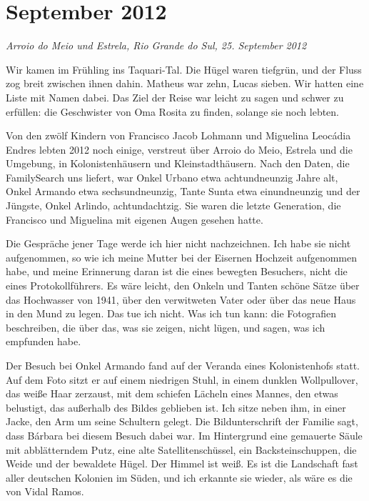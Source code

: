\documentclass[
  ngerman,
  11pt,
  openany]{book}
\begin{document}
\section{September 2012}\label{september-2012}

\emph{Arroio do Meio und Estrela, Rio Grande do Sul, 25. September 2012}

Wir kamen im Frühling ins Taquari-Tal. Die Hügel waren tiefgrün, und der
Fluss zog breit zwischen ihnen dahin. Matheus war zehn, Lucas sieben.
Wir hatten eine Liste mit Namen dabei. Das Ziel der Reise war leicht zu
sagen und schwer zu erfüllen: die Geschwister von Oma Rosita zu finden,
solange sie noch lebten.

Von den zwölf Kindern von Francisco Jacob Lohmann und Miguelina Leocádia
Endres lebten 2012 noch einige, verstreut über Arroio do Meio, Estrela
und die Umgebung, in Kolonistenhäusern und Kleinstadthäusern. Nach den
Daten, die FamilySearch uns liefert, war Onkel Urbano etwa
achtundneunzig Jahre alt, Onkel Armando etwa sechsundneunzig, Tante
Sunta etwa einundneunzig und der Jüngste, Onkel Arlindo, achtundachtzig.
Sie waren die letzte Generation, die Francisco und Miguelina mit eigenen
Augen gesehen hatte.

Die Gespräche jener Tage werde ich hier nicht nachzeichnen. Ich habe sie
nicht aufgenommen, so wie ich meine Mutter bei der Eisernen Hochzeit
aufgenommen habe, und meine Erinnerung daran ist die eines bewegten
Besuchers, nicht die eines Protokollführers. Es wäre leicht, den Onkeln
und Tanten schöne Sätze über das Hochwasser von 1941, über den
verwitweten Vater oder über das neue Haus in den Mund zu legen. Das tue
ich nicht. Was ich tun kann: die Fotografien beschreiben, die über das,
was sie zeigen, nicht lügen, und sagen, was ich empfunden habe.

Der Besuch bei Onkel Armando fand auf der Veranda eines Kolonistenhofs
statt. Auf dem Foto sitzt er auf einem niedrigen Stuhl, in einem dunklen
Wollpullover, das weiße Haar zerzaust, mit dem schiefen Lächeln eines
Mannes, den etwas belustigt, das außerhalb des Bildes geblieben ist. Ich
sitze neben ihm, in einer Jacke, den Arm um seine Schultern gelegt. Die
Bildunterschrift der Familie sagt, dass Bárbara bei diesem Besuch dabei
war. Im Hintergrund eine gemauerte Säule mit abblätterndem Putz, eine
alte Satellitenschüssel, ein Backsteinschuppen, die Weide und der
bewaldete Hügel. Der Himmel ist weiß. Es ist die Landschaft fast aller
deutschen Kolonien im Süden, und ich erkannte sie wieder, als wäre es
die von Vidal Ramos.
\end{document}
